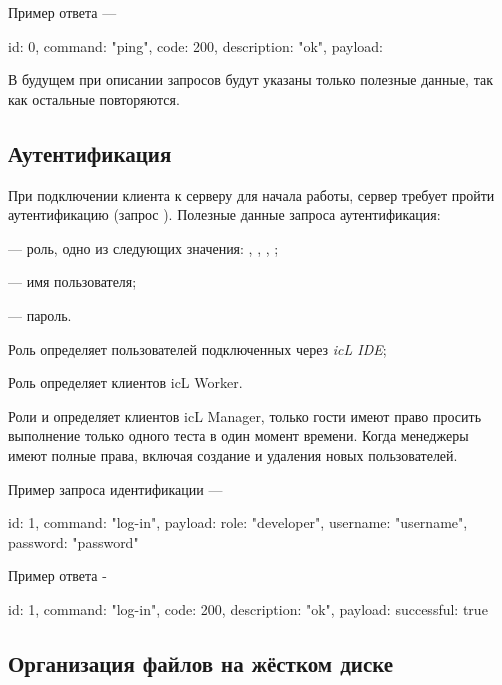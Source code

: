 \newpage

Пример ответа —
\begin{jscode}
{
	id: 0,
	command: "ping",
	code: 200,
	description: "ok",
	payload: {}
}
\end{jscode}

В будущем при описании запросов будут указаны только полезные данные, так как остальные повторяются.

\subsection{Аутентификация}

При подключении клиента к серверу для начала работы, сервер требует пройти аутентификацию (запрос ). Полезные данные запроса аутентификация:
\begin{icItems}
	\item {} — роль, одно из следующих значения: , , , ;
	\item {} — имя пользователя;
	\item {} — пароль.
\end{icItems}

Роль  определяет пользователей подключенных через {\it icL IDE};

Роль  определяет клиентов icL Worker.

Роли  и  определяет клиентов icL Manager, только гости имеют право просить выполнение только одного теста в один момент времени. Когда менеджеры имеют полные права, включая создание и удаления новых пользователей.

Пример запроса идентификации —
\begin{jscode}
{
	id: 1,
	command: "log-in",
	payload: {
		role: "developer",
		username: "username",
		password: "password"
	}
}
\end{jscode}

\newpage
Пример ответа -
\begin{jscode}
{
	id: 1,
	command: "log-in",
	code: 200,
	description: "ok",
	payload: { 
		successful: true 
	}
}
\end{jscode}

\subsection{Организация файлов на жёстком диске}


